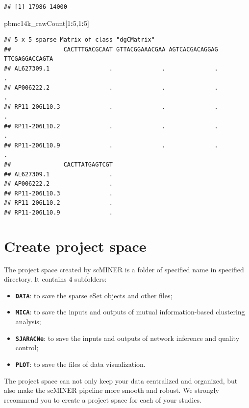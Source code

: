 \documentclass[
  12pt,
]{book}
\newenvironment{Shaded}{\begin{snugshade}}{\end{snugshade}}
\newcommand{\DecValTok}[1]{\textcolor[rgb]{0.00,0.00,0.81}{#1}}
\newcommand{\NormalTok}[1]{#1}
\newcommand{\SpecialCharTok}[1]{\textcolor[rgb]{0.81,0.36,0.00}{\textbf{#1}}}
\providecommand{\tightlist}{%
  \setlength{\itemsep}{0pt}\setlength{\parskip}{0pt}}
\begin{document}
\begin{verbatim}
## [1] 17986 14000
\end{verbatim}

\begin{Shaded}
\begin{Highlighting}[]
\NormalTok{pbmc14k\_rawCount[}\DecValTok{1}\SpecialCharTok{:}\DecValTok{5}\NormalTok{,}\DecValTok{1}\SpecialCharTok{:}\DecValTok{5}\NormalTok{]}
\end{Highlighting}
\end{Shaded}

\begin{verbatim}
## 5 x 5 sparse Matrix of class "dgCMatrix"
##               CACTTTGACGCAAT GTTACGGAAACGAA AGTCACGACAGGAG TTCGAGGACCAGTA
## AL627309.1                 .              .              .              .
## AP006222.2                 .              .              .              .
## RP11-206L10.3              .              .              .              .
## RP11-206L10.2              .              .              .              .
## RP11-206L10.9              .              .              .              .
##               CACTTATGAGTCGT
## AL627309.1                 .
## AP006222.2                 .
## RP11-206L10.3              .
## RP11-206L10.2              .
## RP11-206L10.9              .
\end{verbatim}

\section{Create project space}\label{create-project-space}

The project space created by scMINER is a folder of specified name in specified directory. It contains 4 subfolders:

\begin{itemize}
\tightlist
\item
  \textbf{\texttt{DATA}}: to save the sparse eSet objects and other files;
\item
  \textbf{\texttt{MICA}}: to save the inputs and outputs of mutual information-based clustering analysis;
\item
  \textbf{\texttt{SJARACNe}}: to save the inputs and outputs of network inference and quality control;
\item
  \textbf{\texttt{PLOT}}: to save the files of data visualization.
\end{itemize}

The project space can not only keep your data centralized and organized, but also make the scMINER pipeline more smooth and robust. We strongly recommend you to create a project space for each of your studies.
\end{document}
